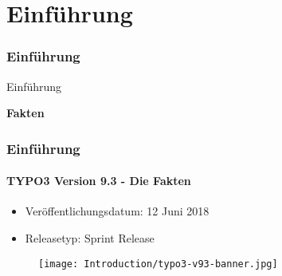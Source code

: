 %

\section{Einführung}
\begin{frame}[fragile]
	\frametitle{Einführung}

	\begin{center}\huge{Einführung}\end{center}
	\begin{center}\huge{\color{typo3darkgrey}\textbf{Fakten}}\end{center}

\end{frame}

\begin{frame}[fragile]
	\frametitle{Einführung}
	\framesubtitle{TYPO3 Version 9.3 - Die Fakten}

	\begin{itemize}
		\item Veröffentlichungsdatum: 12 Juni 2018
		\item Releasetyp: Sprint Release
	\end{itemize}

	\begin{figure}
		\texttt{[image: Introduction/typo3-v93-banner.jpg]}
	\end{figure}

\end{frame}


